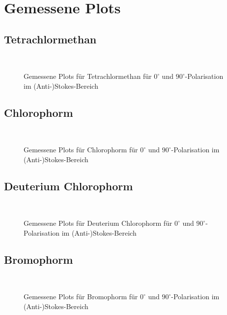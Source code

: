 \chapter{Gemessene Plots}
\section{Tetrachlormethan}
\begin{figure}[h]
    \centering{}\\
    \caption{Gemessene Plots für Tetrachlormethan für $0^\circ$ und $90^\circ$-Polarisation im (Anti-)Stokes-Bereich}
\end{figure}\newpage
\section{Chlorophorm}
\begin{figure}[h]
    \centering{}\\
    \caption{Gemessene Plots für Chlorophorm für $0^\circ$ und $90^\circ$-Polarisation im (Anti-)Stokes-Bereich}
\end{figure}\newpage
\section{Deuterium Chlorophorm}
\begin{figure}[h]
    \centering{}\\
    \caption{Gemessene Plots für Deuterium Chlorophorm für $0^\circ$ und $90^\circ$-Polarisation im (Anti-)Stokes-Bereich}
\end{figure}\newpage
\section{Bromophorm}
\begin{figure}[h]
    \centering{}\\
    \caption{Gemessene Plots für Bromophorm für $0^\circ$ und $90^\circ$-Polarisation im (Anti-)Stokes-Bereich}
\end{figure}\newpage